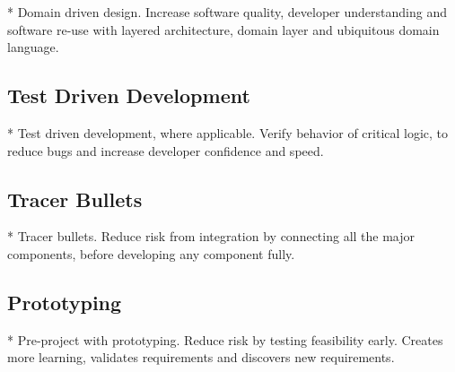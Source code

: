 * Domain driven design. Increase software quality, developer understanding and software re-use with layered architecture, domain layer and ubiquitous domain language.

\subsection{Test Driven Development}

* Test driven development, where applicable. Verify behavior of critical logic, to reduce bugs and increase developer confidence and speed.

\subsection{Tracer Bullets}
* Tracer bullets. Reduce risk from integration by connecting all the major components, before developing any component fully.

\subsection{Prototyping}

* Pre-project with prototyping. Reduce risk by testing feasibility early. Creates more learning, validates requirements and discovers new requirements.
